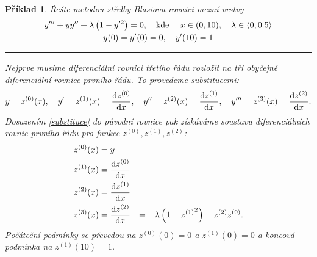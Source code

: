 \documentclass{article}
\newtheorem{example}{Příklad}
\begin{document}
\fontsize{10pt}{15pt}\selectfont
\setcounter{example}{27}
\begin{example}
	Řešte metodou střelby Blasiovu rovnici mezní vrstvy
	\begin{gather*}
		y''' + y y'' + \lambda \left( 1 - y'^{2} \right)  = 0,
		\qq{kde } x \in (0,10) \qcomma \lambda \in \langle 0, 0.5 \rangle \\
		y(0) = y'(0) = 0 \qcomma y'(10) = 1
	\end{gather*}
	\smallskip
	\hrule
	\medskip
	Nejprve musíme diferenciální rovnici třetího řádu rozložit na tři obyčejné diferenciální rovnice prvního řádu. To provedeme substitucemi:
	\begin{equation}
		\label{substituce}
		y = z^{(0)}(x) \qcomma
		y' = z^{(1)}(x) = \dv{z^{(0)}}{x} \qcomma
		y'' = z^{(2)}(x) = \dv{z^{(1)}}{x} \qcomma
		y''' = z^{(3)}(x) = \dv{z^{(2)}}{x}.
	\end{equation}
	Dosazením \ref{substituce} do původní rovnice pak získáváme soustavu diferenciálních rovnic prvního řádu pro funkce $z^{(0)}, z^{(1)}, z^{(2)}$:
	\begin{equation}
		\begin{aligned}
			z^{(0)}(x) & = y                                                                                   \\
			z^{(1)}(x) & = \dv{z^{(0)}}{x}                                                                     \\
			z^{(2)}(x) & = \dv{z^{(1)}}{x}                                                                     \\
			z^{(3)}(x) & = \dv{z^{(2)}}{x}(x) & = -\lambda \left( 1 - {z^{(1)}}^{2} \right)  - z^{(2)}z^{(0)}.
		\end{aligned}
	\end{equation}
	Počáteční podmínky se převedou na $z^{(0)}(0) = 0$ a $z^{(1)}(0) = 0$ a koncová podmínka na $z^{(1)}(10) = 1$.

	\medskip


\end{example}
\end{document}
